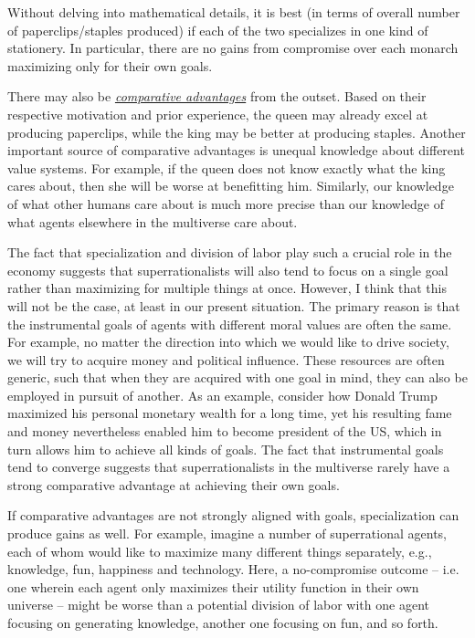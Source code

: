 Without delving into mathematical details, it is best (in terms of
overall number of paperclips/staples produced) if each of the two
specializes in one kind of stationery. In particular, there are no gains
from compromise over each monarch maximizing only for their own goals.

There may also be
\href{https://en.wikipedia.org/wiki/Comparative_advantage}{\emph{comparative
advantages}} from the outset. Based on their respective motivation and
prior experience, the queen may already excel at producing paperclips,
while the king may be better at producing staples. Another important
source of comparative advantages is unequal knowledge about different
value systems. For example, if the queen does not know exactly what the
king cares about, then she will be worse at benefitting him. Similarly,
our knowledge of what other humans care about is much more precise than
our knowledge of what agents elsewhere in the multiverse care about.

The fact that specialization and division of labor play such a crucial
role in the economy suggests that superrationalists will also tend to
focus on a single goal rather than maximizing for multiple things at
once. However, I think that this will not be the case, at least in our
present situation. The primary reason is that the instrumental goals of
agents with different moral values are often the same. For example, no
matter the direction into which we would like to drive society, we will
try to acquire money and political influence. These resources are often
generic, such that when they are acquired with one goal in mind, they
can also be employed in pursuit of another. As an example, consider how
Donald Trump maximized his personal monetary wealth for a long time, yet
his resulting fame and money nevertheless enabled him to become
president of the US, which in turn allows him to achieve all kinds of
goals. The fact that instrumental goals tend to converge suggests that
superrationalists in the multiverse rarely have a strong comparative
advantage at achieving their own goals.

If comparative advantages are not strongly aligned with goals,
specialization can produce gains as well. For example, imagine a number
of superrational agents, each of whom would like to maximize many
different things separately, e.g., knowledge, fun, happiness and
technology. Here, a no-compromise outcome -- i.e. one wherein each agent
only maximizes their utility function in their own universe -- might be
worse than a potential division of labor with one agent focusing on
generating knowledge, another one focusing on fun, and so forth.

